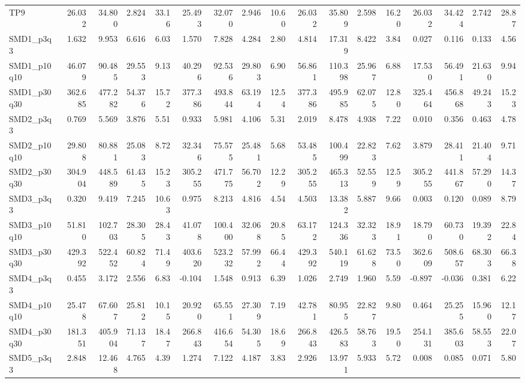 \begin{longtable}{lrrrrrrrrrrrrrrrr}
TP9 & 26.032 & 34.800 & 2.824 & 33.16 & 25.493 & 32.070 & 2.946 & 10.60 & 26.032 & 35.809 & 2.598 & 16.20 & 26.032 & 34.424 & 2.742 & 28.87 \\
SMD1\_p3q3 & 1.632 & 9.953 & 6.616 & 6.03 & 1.570 & 7.828 & 4.284 & 2.80 & 4.814 & 17.319 & 8.422 & 3.84 & 0.027 & 0.116 & 0.133 & 4.56 \\
SMD1\_p10q10 & 46.079 & 90.485 & 29.553 & 9.13 & 40.296 & 92.536 & 29.803 & 6.90 & 56.861 & 110.398 & 25.967 & 6.88 & 17.530 & 56.491 & 21.630 & 9.94 \\
SMD1\_p30q30 & 362.685 & 477.282 & 54.376 & 15.72 & 377.386 & 493.844 & 63.194 & 12.54 & 377.386 & 495.985 & 62.075 & 12.80 & 325.464 & 456.868 & 49.243 & 15.23 \\
SMD2\_p3q3 & 0.769 & 5.569 & 3.876 & 5.51 & 0.933 & 5.981 & 4.106 & 5.31 & 2.019 & 8.478 & 4.938 & 7.22 & 0.010 & 0.356 & 0.463 & 4.78 \\
SMD2\_p10q10 & 29.808 & 80.881 & 25.083 & 8.72 & 32.346 & 75.575 & 25.481 & 5.68 & 53.485 & 100.499 & 22.823 & 7.62 & 3.879 & 28.411 & 21.404 & 9.71 \\
SMD2\_p30q30 & 304.904 & 448.589 & 61.435 & 15.23 & 305.255 & 471.775 & 56.702 & 12.29 & 305.255 & 465.313 & 52.559 & 12.59 & 305.255 & 441.867 & 57.290 & 14.37 \\
SMD3\_p3q3 & 0.320 & 9.419 & 7.245 & 10.63 & 0.975 & 8.213 & 4.816 & 4.54 & 4.503 & 13.382 & 5.887 & 9.66 & 0.003 & 0.120 & 0.089 & 8.79 \\
SMD3\_p10q10 & 51.810 & 102.703 & 28.305 & 28.43 & 41.078 & 100.400 & 32.068 & 20.85 & 63.172 & 124.336 & 32.323 & 18.91 & 18.790 & 60.730 & 19.392 & 22.84 \\
SMD3\_p30q30 & 429.392 & 522.452 & 60.824 & 71.49 & 403.620 & 523.232 & 57.992 & 66.44 & 429.392 & 540.119 & 61.628 & 73.50 & 362.609 & 508.657 & 68.303 & 66.38 \\
SMD4\_p3q3 & 0.455 & 3.172 & 2.556 & 6.83 & -0.104 & 1.548 & 0.913 & 6.39 & 1.026 & 2.749 & 1.960 & 5.59 & -0.897 & -0.036 & 0.381 & 6.22 \\
SMD4\_p10q10 & 25.478 & 67.607 & 25.812 & 10.15 & 20.920 & 65.551 & 27.309 & 7.19 & 42.781 & 80.955 & 22.827 & 9.80 & 0.464 & 25.255 & 15.960 & 12.17 \\
SMD4\_p30q30 & 181.351 & 405.904 & 71.137 & 18.47 & 266.843 & 416.654 & 54.305 & 18.69 & 266.843 & 426.583 & 58.763 & 19.50 & 254.131 & 385.603 & 58.553 & 22.07 \\
SMD5\_p3q3 & 2.848 & 12.468 & 4.765 & 4.39 & 1.274 & 7.122 & 4.187 & 3.83 & 2.926 & 13.971 & 5.933 & 5.72 & 0.008 & 0.085 & 0.071 & 5.80 \\

\end{longtable}
